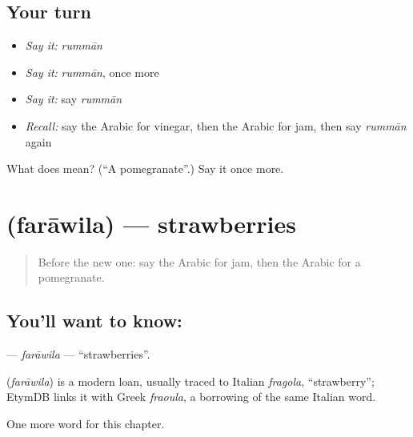 \subsection*{Your turn}
\begin{itemize}
\raggedright
  \item \emph{Say it:} \emph{rummān}
  \item \emph{Say it:} \emph{rummān}, once more
  \item \emph{Say it:} say \emph{rummān}
  \item \emph{Recall:} say the Arabic for vinegar, then the Arabic for jam, then say \emph{rummān} again
\end{itemize}

\begin{tcolorbox}[breakable,colback=teal!4,colframe=teal!35!black,title={Before you move on}]
What does  mean? (\textquotedblleft{}A pomegranate\textquotedblright{}.) Say it once more.
\end{tcolorbox}
\section[\texorpdfstring{\ar{فراولة} (farāwila)}{فراولة (farāwila)}]{ (farāwila) — strawberries}

\label{lesson:AR-C120-farawila}



\begin{quote}
Before the new one: say the Arabic for jam, then the Arabic for a pomegranate.
\end{quote}

\subsection*{You'll want to know: }
\textbf{} — \emph{farāwila} — \textquotedblleft{}strawberries\textquotedblright{}.

\begin{cousinweb}
\textbf{} (\emph{farāwila}) is a modern loan, usually traced to Italian \emph{fragola}, \textquotedblleft{}strawberry\textquotedblright{}; EtymDB links it with Greek \emph{fraoula}, a borrowing of the same Italian word.
\end{cousinweb}

\begin{grammarlens}[title={What you've built}]
One more word for this chapter.
\end{grammarlens}

